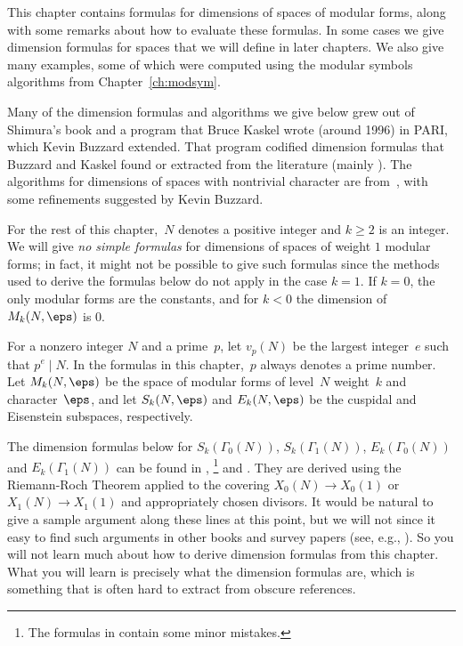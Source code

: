 This chapter contains formulas for dimensions of spaces of modular
forms, along with some remarks about how to evaluate these formulas.
In some cases we give dimension formulas for spaces that we
will define in later chapters.  
We also give
many examples, some of which were computed using the modular symbols
algorithms from Chapter~\ref{ch:modsym}.

Many of the dimension formulas and algorithms we give below grew out
of Shimura's book \cite{shimura:intro} and a program that Bruce Kaskel
wrote (around 1996) in PARI, which Kevin Buzzard extended.  That
program codified dimension formulas that Buzzard and Kaskel found or
extracted from the literature (mainly \cite[\S2.6]{shimura:intro}).
The algorithms for dimensions of spaces with nontrivial character are
from~\cite{cohen-oesterle:dimensions}, with some refinements
suggested by Kevin Buzzard.

For the rest of this chapter,~$N$ denotes a positive integer and
$k\geq 2$ is an integer.  We will give {\em no simple formulas} for
dimensions of spaces of weight $1$ modular forms; in fact, it 
might not be possible to give such formulas since the 
methods used to derive the formulas below do not apply in the case
$k=1$.  If $k=0$, the only modular forms are the constants, and for
$k<0$ the dimension of $M_k(N,\eps)$ is $0$.

For a nonzero integer $N$ and a prime~$p$, let $v_p(N)$ be the largest
integer~$e$ such that $p^e \mid N$.  In the formulas in this
chapter,~$p$ always denotes a prime number.  Let $M_k(N,\eps)$ be the
space of modular forms of level~$N$ weight~$k$ and character~$\eps$,
and let $S_k(N,\eps)$ and $E_k(N,\eps)$ be the cuspidal and Eisenstein
subspaces, respectively.

The dimension formulas below for $S_k(\Gamma_0(N))$,
$S_k(\Gamma_1(N))$, $E_k(\Gamma_0(N))$ and $E_k(\Gamma_1(N))$ can be
found in \cite[Ch.~3]{diamond-shurman},
\cite[\S2.6]{shimura:intro}\footnote{The formulas in
  \cite[\S2.6]{shimura:intro} contain some minor mistakes.} and
\cite[\S2.5]{miyake}. They are derived using the Riemann-Roch Theorem
applied to the covering $X_0(N)\to X_0(1)$ or $X_1(N)\to X_1(1)$ and
appropriately chosen divisors.  It would be natural to give a sample
argument along these lines at this point, but we will not since it
easy to find such arguments in other books and survey papers (see,
e.g., \cite{diamond-im}).  So you will not learn much about how to
derive dimension formulas from this chapter.  What you will learn is
precisely what the dimension formulas are, which is something that is
often hard to extract from obscure references.

